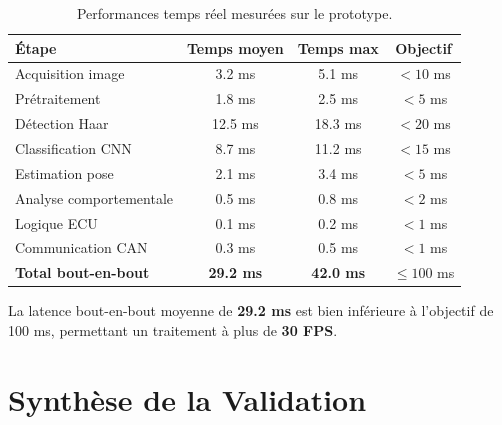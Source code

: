 \documentclass[12pt,a4paper,twoside]{report}
\begin{document}
\begin{table}[H]
\centering
\caption{Performances temps réel mesurées sur le prototype.}
\label{tab:realtime_perf}
\renewcommand{\arraystretch}{1.3}
\begin{tabular}{|l|c|c|c|}
\hline
\rowcolor{stellantisblue!15}
\textbf{Étape} & \textbf{Temps moyen} & \textbf{Temps max} & \textbf{Objectif} \\
\hline
Acquisition image & 3.2 ms & 5.1 ms & $< 10$ ms \\
\hline
Prétraitement & 1.8 ms & 2.5 ms & $< 5$ ms \\
\hline
Détection Haar & 12.5 ms & 18.3 ms & $< 20$ ms \\
\hline
Classification CNN & 8.7 ms & 11.2 ms & $< 15$ ms \\
\hline
Estimation pose & 2.1 ms & 3.4 ms & $< 5$ ms \\
\hline
Analyse comportementale & 0.5 ms & 0.8 ms & $< 2$ ms \\
\hline
Logique ECU & 0.1 ms & 0.2 ms & $< 1$ ms \\
\hline
Communication CAN & 0.3 ms & 0.5 ms & $< 1$ ms \\
\hline
\textbf{Total bout-en-bout} & \textbf{29.2 ms} & \textbf{42.0 ms} & $\leq 100$ ms \\
\hline
\end{tabular}
\end{table}

La latence bout-en-bout moyenne de \textbf{29.2 ms} est bien inférieure à l'objectif de 100 ms, permettant un traitement à plus de \textbf{30 FPS}.

\section{Synthèse de la Validation}
\end{document}
